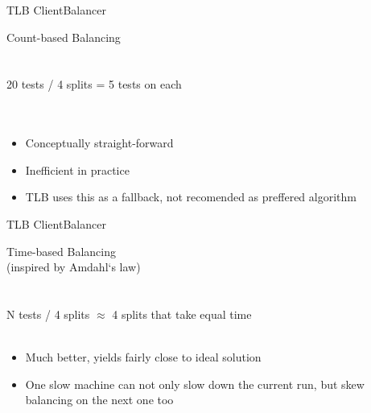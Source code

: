 \documentclass{beamer}
\begin{document}
\begin{frame}{TLB Client}{Balancer}
  \begin{center}
    {\large Count-based Balancing}\\
    \quad\\
    \quad\\
    20 tests / 4 splits = 5 tests on each\\
    \quad\\
    \quad\\
    \begin{itemize}
    \item Conceptually straight-forward
    \item Inefficient in practice
    \item TLB uses this as a fallback, not recomended as preffered algorithm
    \end{itemize}
  \end{center}
\end{frame}

\begin{frame}{TLB Client}{Balancer}
  \begin{center}
    {\large Time-based Balancing}\\
    {\tiny (inspired by Amdahl`s law)}\\
    \quad\\
    \quad\\
    N tests / 4 splits $\approx$ 4 splits that take equal time
    \quad\\
    \quad\\
    \begin{itemize}
    \item Much better, yields fairly close to ideal solution
    \item One slow machine can not only slow down the current run, but skew balancing on the next one too
    \end{itemize}
  \end{center}
\end{frame}
\end{document}
